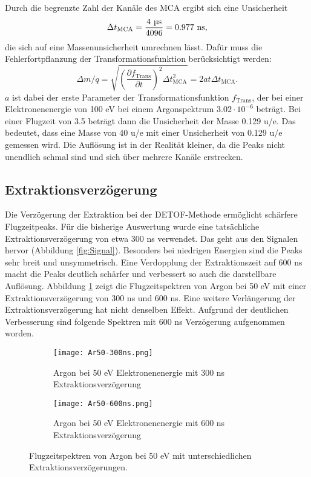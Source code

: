 Durch die begrenzte Zahl der Kanäle des MCA ergibt sich eine Unsicherheit 
\begin{equation}
    \Delta t_{\mathrm{MCA}} = \frac{4 \text{ \textmu{s}}}{4096} = 0.977 \text{ ns},
\end{equation} 
die sich auf eine Massenunsicherheit umrechnen lässt. Dafür muss die Fehlerfortpflanzung der Transformationsfunktion berücksichtigt werden:
\begin{equation}
    \Delta m/q = \sqrt{\left(\frac{\partial f_\mathrm{Trans}}{\partial t}\right)^2 \Delta t_{\mathrm{MCA}}^2} = 2at\Delta t_{\mathrm{MCA}}.
\end{equation}
$a$ ist dabei der erste Parameter der Transformationsfunktion $f_\mathrm{Trans}$, der bei einer Elektronenenergie von 100 eV bei einem Argonspektrum $3.02 \cdot 10^{-6}$ beträgt. Bei einer Flugzeit von 3.5  beträgt dann die Unsicherheit der Masse 0.129 u/e. Das bedeutet, dass eine Masse von 40 u/e mit einer Unsicherheit von 0.129 u/e gemessen wird. Die Auflösung ist in der Realität kleiner, da die Peaks nicht unendlich schmal sind und sich über mehrere Kanäle erstrecken.

\subsection{Extraktionsverzögerung}
Die Verzögerung der Extraktion bei der DETOF-Methode ermöglicht schärfere Flugzeitpeaks. Für die bisherige Auswertung wurde eine tatsächliche Extraktionsverzögerung von etwa 300 ns verwendet. Das geht aus den Signalen hervor (Abbildung \ref{fig:Signal}). Besonders bei niedrigen Energien sind die Peaks sehr breit und unsymmetrisch. Eine Verdopplung der Extraktionszeit auf 600 ns macht die Peaks deutlich schärfer und verbessert so auch die darstellbare Auflösung. Abbildung \ref{fig:delay} zeigt die Flugzeitspektren von Argon bei 50 eV mit einer Extraktionsverzögerung von 300 ns und 600 ns. Eine weitere Verlängerung der Extraktionsverzögerung hat nicht denselben Effekt. Aufgrund der deutlichen Verbesserung sind folgende Spektren mit 600 ns Verzögerung aufgenommen worden.
\begin{figure}[H]
    \centering
    \begin{subfigure}{.48\textwidth}
        \centering
        \texttt{[image: Ar50-300ns.png]}
        \caption{Argon bei 50 eV Elektronenenergie mit 300 ns Extraktionsverzögerung}
    \end{subfigure}%
    \hfill
    \begin{subfigure}{.48\textwidth}
        \centering
        \texttt{[image: Ar50-600ns.png]}
        \caption{Argon bei 50 eV Elektronenenergie mit 600 ns Extraktionsverzögerung}
        
    \end{subfigure}
    \caption[Einfluss der Extraktionsverzögerung auf Flugzeitspektren]{Flugzeitspektren von Argon bei 50 eV mit unterschiedlichen Extraktionsverzögerungen.}
    \label{fig:delay}
\end{figure}


